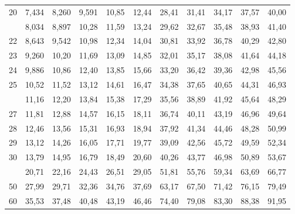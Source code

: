 \begin{tabular}{@{}c|*{10}{c}@{}}
20 & 7,434 & 8,260 & 9,591 & 10,85 & 12,44 & 28,41 & 31,41 & 34,17 & 37,57 & 40,00\\
\addlinespace[2pt]
21 & 8,034 & 8,897 & 10,28 & 11,59 & 13,24 & 29,62 & 32,67 & 35,48 & 38,93 & 41,40\\
22 & 8,643 & 9,542 & 10,98 & 12,34 & 14,04 & 30,81 & 33,92 & 36,78 & 40,29 & 42,80\\
23 & 9,260 & 10,20 & 11,69 & 13,09 & 14,85 & 32,01 & 35,17 & 38,08 & 41,64 & 44,18\\
24 & 9,886 & 10,86 & 12,40 & 13,85 & 15,66 & 33,20 & 36,42 & 39,36 & 42,98 & 45,56\\
25 & 10,52 & 11,52 & 13,12 & 14,61 & 16,47 & 34,38 & 37,65 & 40,65 & 44,31 & 46,93\\
\addlinespace[2pt]
26 & 11,16 & 12,20 & 13,84 & 15,38 & 17,29 & 35,56 & 38,89 & 41,92 & 45,64 & 48,29\\
27 & 11,81 & 12,88 & 14,57 & 16,15 & 18,11 & 36,74 & 40,11 & 43,19 & 46,96 & 49,64\\
28 & 12,46 & 13,56 & 15,31 & 16,93 & 18,94 & 37,92 & 41,34 & 44,46 & 48,28 & 50,99\\
29 & 13,12 & 14,26 & 16,05 & 17,71 & 19,77 & 39,09 & 42,56 & 45,72 & 49,59 & 52,34\\
30 & 13,79 & 14,95 & 16,79 & 18,49 & 20,60 & 40,26 & 43,77 & 46,98 & 50,89 & 53,67\\
\addlinespace[2pt]
40 & 20,71 & 22,16 & 24,43 & 26,51 & 29,05 & 51,81 & 55,76 & 59,34 & 63,69 & 66,77\\
50 & 27,99 & 29,71 & 32,36 & 34,76 & 37,69 & 63,17 & 67,50 & 71,42 & 76,15 & 79,49\\
60 & 35,53 & 37,48 & 40,48 & 43,19 & 46,46 & 74,40 & 79,08 & 83,30 & 88,38 & 91,95\\
\bottomrule\end{tabular}